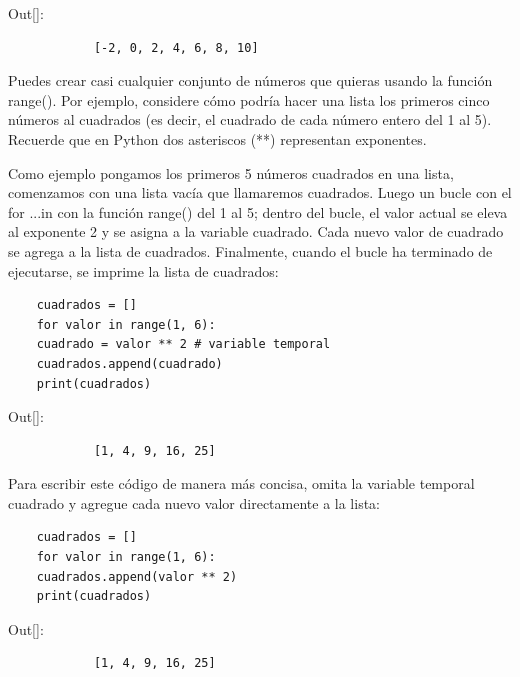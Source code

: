 \vspace{0.09cm}
{\ttfamily\scriptsize\scriptsize\noindent Out[]: \vspace{-0.3cm}	
	{\color{blue} 	
		\begin{verbatim}
			[-2, 0, 2, 4, 6, 8, 10]
		\end{verbatim}
}} 


Puedes crear casi cualquier conjunto de números que quieras usando la función  {\ttfamily range()}. Por ejemplo, considere cómo podría hacer una lista los primeros cinco números al cuadrados (es decir, el cuadrado de cada número entero del 1 al 5). Recuerde que en Python dos asteriscos (**) representan exponentes.

Como ejemplo pongamos los primeros 5 números cuadrados en una lista, comenzamos con una lista vacía que llamaremos cuadrados. 
Luego un bucle con el {\ttfamily for ...in} con  la función {\ttfamily range()}  del 1 al 5; dentro del bucle, el valor actual se eleva al exponente 2 y se asigna a la variable cuadrado. Cada nuevo valor de cuadrado se agrega a la lista de cuadrados.
Finalmente, cuando el bucle ha terminado de ejecutarse, se imprime la lista de cuadrados:

\hspace{-3cm}{\ttfamily \scriptsize cuadrados01.py}  \vspace{-0.5cm}
\begin{lstlisting}
	cuadrados = []
	for valor in range(1, 6):
	cuadrado = valor ** 2 # variable temporal
	cuadrados.append(cuadrado)
	print(cuadrados)
\end{lstlisting}

{\ttfamily\scriptsize\scriptsize 
	\noindent Out[]:\vspace{-0.3cm}	
	{\color{blue} 	
		\begin{verbatim}
			[1, 4, 9, 16, 25]
		\end{verbatim}
}}
\noindent Para escribir este código de manera más concisa, omita la variable temporal cuadrado
y agregue cada nuevo valor directamente a la lista:

\hspace{-3cm}{\ttfamily \scriptsize cuadrados02.py}  \vspace{-0.5cm}
\begin{lstlisting}
	cuadrados = []
	for valor in range(1, 6):
	cuadrados.append(valor ** 2)
	print(cuadrados)
\end{lstlisting}

{\ttfamily\scriptsize\scriptsize 
	\noindent Out[]:\vspace{-0.3cm}	
	{\color{blue} 	
		\begin{verbatim}
			[1, 4, 9, 16, 25]
		\end{verbatim}
}}

